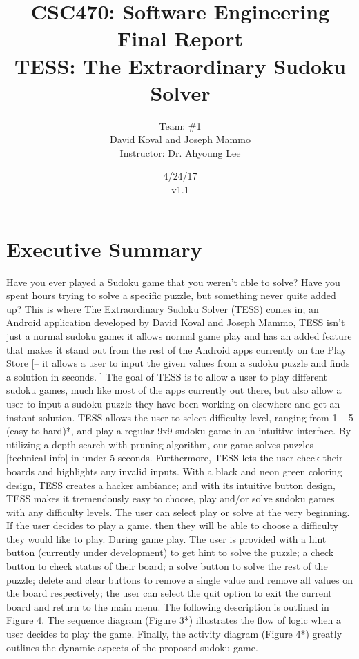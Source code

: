 \documentclass{article}
\title{CSC470: Software Engineering Final Report\\ TESS: The Extraordinary Sudoku Solver}
\author{Team: \#1 \\David Koval and Joseph Mammo\\Instructor: Dr. Ahyoung Lee}
\date{ 4/24/17 \\ v1.1 }
\begin{document}
 
\maketitle

\clearpage

\tableofcontents

\clearpage

\section{Executive Summary} 

Have you ever played a Sudoku game that you weren’t able to solve? Have you spent hours trying to solve a specific puzzle, but something never quite added up? This is where The Extraordinary Sudoku Solver (TESS) comes in; an Android application developed by David Koval and Joseph Mammo, TESS isn’t just a normal sudoku game: it allows normal game play and has an added feature that makes it stand out from the rest of the Android apps currently on the Play Store [– it allows a user to input the given values from a sudoku puzzle and finds a solution in seconds. ] \newline \newline
The goal of TESS is to allow a user to play different sudoku games, much like most of the apps currently out there, but also allow a user to input a sudoku puzzle they have been working on elsewhere and get an instant solution. TESS allows the user to select difficulty level, ranging from 1 – 5 (easy to hard)*, and play a regular 9x9 sudoku game in an intuitive interface. By utilizing a depth search with pruning algorithm, our game solves puzzles [technical info] in under 5 seconds. Furthermore, TESS lets the user check their boards and highlights any invalid inputs.\newline \newline
With a black and neon green coloring design, TESS creates a hacker ambiance; and with its intuitive button design, TESS makes it tremendously easy to choose, play and/or solve sudoku games with any difficulty levels. The user can select play or solve at the very beginning. If the user decides to play a game, then they will be able to choose a difficulty they would like to play. During game play. The user is provided with a hint button (currently under development) to get hint to solve the puzzle; a check button to check status of their board; a solve button to solve the rest of the puzzle; delete and clear buttons to remove a single value and remove all values on the board respectively; the user can select the quit option to exit the current board and return to the main menu. The following description is outlined in Figure 4. The sequence diagram (Figure 3*) illustrates the flow of logic when a user decides to play the game. Finally, the activity diagram (Figure 4*) greatly outlines the dynamic aspects of the proposed sudoku game.  \newline \newline
\end{document}
